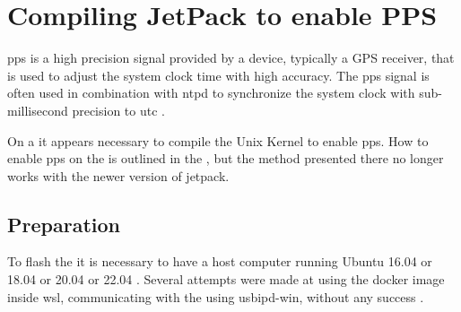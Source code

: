 

\section{Compiling JetPack to enable PPS}
\gls{pps} is a high precision signal provided by a device, typically a GPS receiver, that is used to adjust the system clock time with high accuracy. The \gls{pps} signal is often used in combination with \gls{ntpd} to synchronize the system clock with sub-millisecond precision to \gls{utc} \cite{giomettiLinuxPPSWikiLinuxPPS2020}.

On a \jx it appears necessary to compile the Unix Kernel to enable \gls{pps}.
How to enable \gls{pps} on the \jx is outlined in the \preproject, but the method presented there no longer works with the newer version of \gls{jetpack}.

\subsection{Preparation}
To flash the \jx it is necessary to have a host computer running Ubuntu 16.04 or 18.04 or 20.04 or 22.04 \cite{nvidiaSDKManager2019}.
Several attempts were made at using the docker image inside \gls{wsl}, communicating with the \jx using usbipd-win, without any success \cite{martensPortableSensorRig2022} \cite{nvidiaSDKManager2019} \cite{dorsselaerUsbipdwin2023}.



